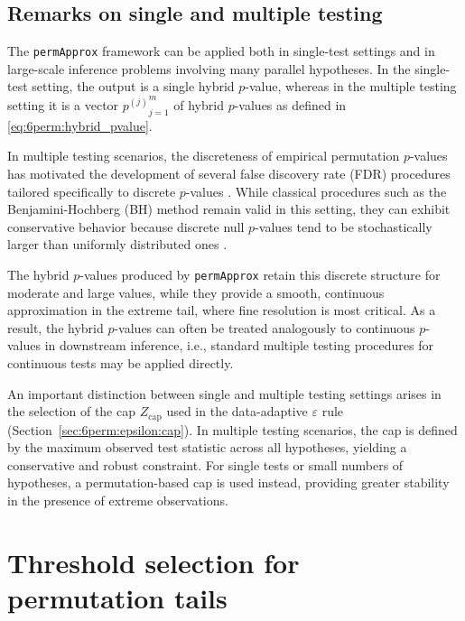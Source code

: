 \subsection{Remarks on single and multiple testing}
\label{sec:6perm:workflow:multiple_testing}

The \texttt{permApprox} framework can be applied both in single-test settings and in large-scale inference problems involving many parallel hypotheses. In the single-test setting, the output is a single hybrid $p$-value, whereas in the multiple testing setting it is a vector ${p^{(j)}}_{j=1}^m$ of hybrid $p$-values as defined in \eqref{eq:6perm:hybrid_pvalue}.

In multiple testing scenarios, the discreteness of empirical permutation $p$-values has motivated the development of several false discovery rate (FDR) procedures tailored specifically to discrete $p$-values \citep{gilbert2005modified,jiang2017discrete}. While classical procedures such as the Benjamini-Hochberg (BH) method  \citep{benjamini1995controlling} remain valid in this setting, they can exhibit conservative behavior because discrete null $p$-values tend to be stochastically larger than uniformly distributed ones \citep{benjamini2001control}.

The hybrid $p$-values produced by \texttt{permApprox} retain this discrete structure for moderate and large values, while they provide a smooth, continuous approximation in the extreme tail, where fine resolution is most critical. As a result, the hybrid $p$-values can often be treated analogously to continuous $p$-values in downstream inference, i.e., standard multiple testing procedures for continuous tests may be applied directly.

An important distinction between single and multiple testing settings arises in the selection of the cap $Z_{\mathrm{cap}}$ used in the data-adaptive $\varepsilon$ rule (Section~\ref{sec:6perm:epsilon:cap}). In multiple testing scenarios, the cap is defined by the maximum observed test statistic across all hypotheses, yielding a conservative and robust constraint. For single tests or small numbers of hypotheses, a permutation-based cap is used instead, providing greater stability in the presence of extreme observations.

\section{Threshold selection for permutation tails}
\label{sec:6perm:threshold}

